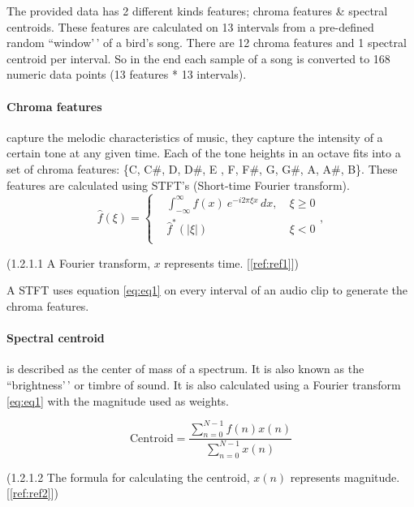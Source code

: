 \documentclass[
]{article}
\begin{document}
The provided data has 2 different kinds features; chroma features \&
spectral centroids. These features are calculated on 13 intervals from a
pre-defined random ``window'\,' of a bird's song. There are 12 chroma
features and 1 spectral centroid per interval. So in the end each sample
of a song is converted to 168 numeric data points (13 features * 13
intervals).

\hypertarget{chroma-features}{%
\paragraph{Chroma features}\label{chroma-features}}

capture the melodic characteristics of music, they capture the intensity
of a certain tone at any given time. Each of the tone heights in an
octave fits into a set of chroma features: \{C, C\#, D, D\#, E , F, F\#,
G, G\#, A, A\#, B\}. These features are calculated using STFT's
(Short-time Fourier transform). \[
{\displaystyle {\hat {f}}(\xi )=\left\{{\begin{aligned}&\int _{-\infty }^{\infty }f(x)\ e^{-i2\pi \xi x}\,dx,\ &\xi \geq 0\\&{\hat {f}}^{*}(|\xi |)&\xi <0\\\end{aligned}}\right.,}
\]

\begin{center}
(\label{eq:eq1}1.2.1.1 A Fourier transform, $x$ represents time. [\ref{ref:ref1}])
\end{center}

A STFT uses equation \ref{eq:eq1} on every interval of an audio clip to
generate the chroma features.

\hypertarget{spectral-centroid}{%
\paragraph{Spectral centroid}\label{spectral-centroid}}

is described as the center of mass of a spectrum. It is also known as
the ``brightness'\,' or timbre of sound. It is also calculated using a
Fourier transform \ref{eq:eq1} with the magnitude used as weights.

\[
{\displaystyle \mathrm {Centroid} ={\frac {\sum _{n=0}^{N-1}f(n)x(n)}{\sum _{n=0}^{N-1}x(n)}}}
\]

\begin{center}
(\label{eq:eq2}1.2.1.2 The formula for calculating the centroid, $x(n)$ represents magnitude. [\ref{ref:ref2}])
\end{center}
\end{document}
